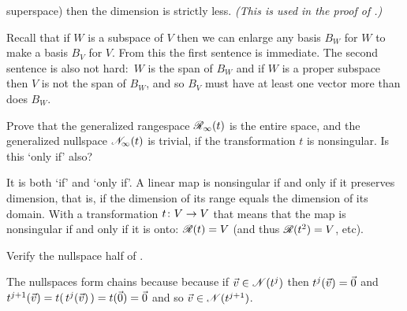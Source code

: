 \begin{exercises}
    superspace) then the dimension is strictly less.
    \textit{(This is used in the proof of
             .)}
    \begin{answer}
      Recall that if $W$ is a subspace of $V$ then we can enlarge
      any basis $B_W$ for $W$
      to make a basis $B_V$ for $V$.
      From this the first sentence is immediate.
      The second sentence is also not hard:~$W$ is the span of $B_W$ and
      if $W$ is a proper subspace then $V$ is not the span of $B_W$, and
      so $B_V$ must have at least one vector more than does $B_W$.     
    \end{answer}
  \recommended\item 
    Prove that the generalized rangespace $\mathscr{R}_\infty(t)$ is the
    entire space, and the generalized nullspace $\mathscr{N}_\infty(t)$ is trivial,
    if the transformation $t$ is nonsingular.
    Is this `only if' also?
    \begin{answer}
      It is both `if' and `only if'.
      A linear map is nonsingular
      if and only if it preserves dimension, that is, if the dimension of 
      its range equals the dimension of its domain.
      With a transformation $\mbox{$t\colon V\to V$}$ that means that 
      the map is nonsingular if and only if it is onto:
      $\mathscr{R}(t)=V$ (and thus $\mathscr{R}(t^2)=V$, etc).
    \end{answer}
  \item \label{exer:RangeAndNullChains} 
    Verify the nullspace half of .
    \begin{answer}
      The nullspaces form chains because
      because if $\vec{v}\in\mathscr{N}(t^j)$ then $t^j(\vec{v})=\vec{0}$
      and $t^{j+1}(\vec{v})=t(\,t^j(\vec{v})\,)=t(\vec{0})=\vec{0}$ and
      so $\vec{v}\in\mathscr{N}(t^{j+1})$.


\end{answer}
\end{exercises}
